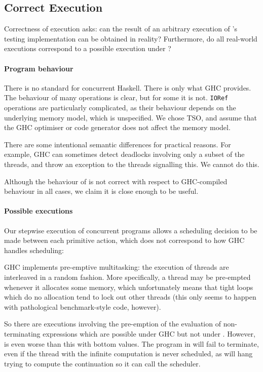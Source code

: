 \subsection{Correct Execution}

Correctness of execution asks: can the result of an arbitrary
execution of \dejafu{}'s testing implementation can be obtained in
reality?  Furthermore, do all real-world executions correspond to a
possible execution under \dejafu{}?

\paragraph{Program behaviour}
There is no standard for concurrent Haskell.  There is only what GHC
provides.  The behaviour of many operations is clear, but for some it
is not.  \verb|IORef| operations are particularly complicated, as their
behaviour depends on the underlying memory model, which is
unspecified.  We chose TSO, and assume that the GHC optimiser or code
generator does not affect the memory model.

There are some intentional semantic differences for practical reasons.
For example, GHC can sometimes detect deadlocks involving only a
subset of the threads, and throw an exception to the threads
signalling this.  We cannot do this.

Although the behaviour of \dejafu{} is not correct with respect to
GHC-compiled behaviour in all cases, we claim it is close enough to be
useful.

\paragraph{Possible executions}
Our stepwise execution of concurrent programs allows a scheduling
decision to be made between each primitive action, which does not
correspond to how GHC handles scheduling:

\begin{displayquote}
  GHC implements pre-emptive multitasking: the execution of threads
  are interleaved in a random fashion.  More specifically, a thread may
  be pre-empted whenever it allocates some memory, which unfortunately
  means that tight loops which do no allocation tend to lock out other
  threads (this only seems to happen with pathological benchmark-style
  code, however). \parencite{control_concurrent}
\end{displayquote}

So there are executions involving the pre-emption of the evaluation of
non-terminating expressions which are possible under GHC but not under
\dejafu{}.  However, \dejafu{} is even worse than this with bottom
values.  The program in  will fail to terminate, even
if the thread with the infinite computation is never scheduled, as
\dejafu{} will hang trying to compute the continuation so it can call
the scheduler.

